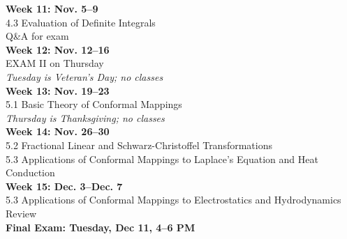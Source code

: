 \documentclass[11pt]{article}
\begin{document}
{\bf Week 11: Nov. 5--9}\\ 
4.3 Evaluation of Definite Integrals\\
Q\&A for exam\\ 


{\bf Week 12: Nov. 12--16}\\
EXAM II on Thursday \\ 
{\it Tuesday is Veteran's Day; no classes}\\ 


{\bf Week 13: Nov. 19--23}\\
5.1 Basic Theory of Conformal Mappings\\
{\it Thursday is Thanksgiving; no classes}\\

{\bf Week 14: Nov. 26--30}\\ 
5.2 Fractional Linear and Schwarz-Christoffel Transformations \\
5.3 Applications of Conformal Mappings to Laplace's Equation and  Heat  Conduction\\

{\bf Week 15: Dec. 3--Dec. 7}\\ 
5.3 Applications of Conformal Mappings to Electrostatics and Hydrodynamics\\
Review\\   

{\bf Final Exam: Tuesday, Dec 11, 4--6 PM}
\end{document}
